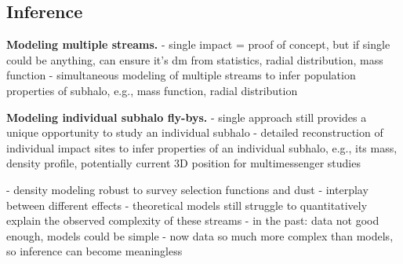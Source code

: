 \documentclass[final,5p,times,twocolumn,authoryear]{elsarticle}
\begin{document}

\subsection{Inference}
\textbf{Modeling multiple streams.}
- single impact = proof of concept, but if single could be anything, can ensure it's dm from statistics, radial distribution, mass function
- simultaneous modeling of multiple streams to infer population properties of subhalo, e.g., mass function, radial distribution

\textbf{Modeling individual subhalo fly-bys.}
- single approach still provides a unique opportunity to study an individual subhalo
- detailed reconstruction of individual impact sites to infer properties of an individual subhalo, e.g., its mass, density profile, potentially current 3D position for multimessenger studies

- density modeling robust to survey selection functions and dust \citep{patrick:2022}
- interplay between different effects
- theoretical models still struggle to quantitatively explain the observed complexity of these streams
- in the past: data not good enough, models could be simple
- now data so much more complex than models, so inference can become meaningless




\end{document}
